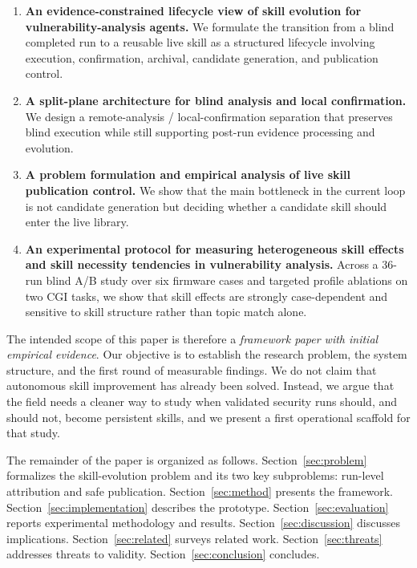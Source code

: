 ﻿\documentclass[preprint,12pt]{elsarticle}
\begin{document}
\begin{enumerate}[leftmargin=*]
    \item \textbf{An evidence-constrained lifecycle view of skill evolution
    for vulnerability-analysis agents.} We formulate the transition from a
    blind completed run to a reusable live skill as a structured lifecycle
    involving execution, confirmation, archival, candidate generation, and
    publication control.

    \item \textbf{A split-plane architecture for blind analysis and local
    confirmation.} We design a remote-analysis / local-confirmation
    separation that preserves blind execution while still supporting
    post-run evidence processing and evolution.

    \item \textbf{A problem formulation and empirical analysis of live skill
    publication control.} We show that the main bottleneck in the current
    loop is not candidate generation but deciding whether a candidate skill
    should enter the live library.

    \item \textbf{An experimental protocol for measuring heterogeneous skill
    effects and skill necessity tendencies in vulnerability analysis.}
    Across a 36-run blind A/B study over six firmware cases and targeted
    profile ablations on two CGI tasks, we show that skill effects are
    strongly case-dependent and sensitive to skill structure rather than
    topic match alone.
\end{enumerate}

The intended scope of this paper is therefore a \emph{framework paper with
initial empirical evidence}.  Our objective is to establish the research
problem, the system structure, and the first round of measurable findings.
We do not claim that autonomous skill improvement has already been solved.
Instead, we argue that the field needs a cleaner way to study when
validated security runs should, and should not, become persistent skills,
and we present a first operational scaffold for that study.

The remainder of the paper is organized as follows.
Section~\ref{sec:problem} formalizes the skill-evolution problem and its
two key subproblems: run-level attribution and safe publication.
Section~\ref{sec:method} presents the framework.
Section~\ref{sec:implementation} describes the prototype.
Section~\ref{sec:evaluation} reports experimental methodology and results.
Section~\ref{sec:discussion} discusses implications.
Section~\ref{sec:related} surveys related work.
Section~\ref{sec:threats} addresses threats to validity.
Section~\ref{sec:conclusion} concludes.
\end{document}
